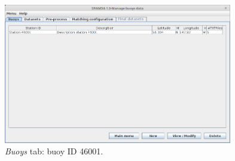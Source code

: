 \documentclass[energies,article,accept,moreauthors,pdftex]{Definitions/mdpi}
\begin{document}
\nointerlineskip
\begin{figure}[H]
				\widefigure
				\includegraphics[width=0.89\textwidth]{figures/FigureManage_buoys.png}
				\caption{\textit{Buoys} tab: buoy ID 46001.}\label{fig:manage_buoys}
			\end{figure}
\end{document}

